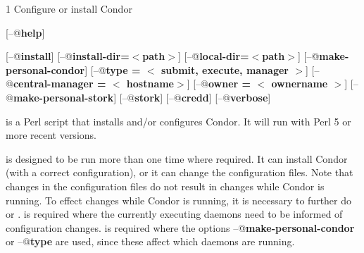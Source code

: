 \begin{ManPage}{\label{man-condor-configure}}{1}
{Configure or install Condor}

\Synopsis {}
[\verb@--@\textbf{help}]

[\verb@--@\textbf{install}]
[\verb@--@\textbf{install-dir=$<$path$>$}]
[\verb@--@\textbf{local-dir=$<$path$>$}]
[\verb@--@\textbf{make-personal-condor}]
[\verb@--@\textbf{type = $<$ submit, execute, manager $>$}]
[\verb@--@\textbf{central-manager = $<$ hostname$>$}]
[\verb@--@\textbf{owner = $<$ ownername $>$}]
[\verb@--@\textbf{make-personal-stork}]
[\verb@--@\textbf{stork}]
[\verb@--@\textbf{credd}]
[\verb@--@\textbf{verbose}]






\Description 

 is a Perl script that installs and/or configures
Condor.
It will run with Perl 5 or more recent versions.

 is designed to be run more than one time
where required.
It can install Condor (with a correct configuration),
or it can change the configuration files.
Note that changes in the configuration files do not result
in changes while Condor is running.
To effect changes while Condor is running,
it is necessary to further do  or .
  is required where the currently executing
daemons need to be informed of configuration changes.
 is required where the options
\verb@--@\textbf{make-personal-condor} or
\verb@--@\textbf{type}
are used, since these affect which daemons are running.


\end{ManPage}
